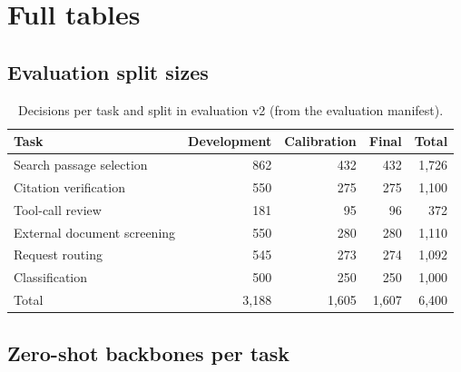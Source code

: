 \section{Full tables}
\label{app:tables}

\subsection{Evaluation split sizes}

\begin{table}[h]
\centering
\small
\caption{Decisions per task and split in evaluation v2 (from the evaluation manifest).}
\label{tab:splits}
\begin{tabular}{@{}lrrrr@{}}
\toprule
Task & Development & Calibration & Final & Total \\
\midrule
Search passage selection & 862 & 432 & 432 & 1,726 \\
Citation verification & 550 & 275 & 275 & 1,100 \\
Tool-call review & 181 & 95 & 96 & 372 \\
External document screening & 550 & 280 & 280 & 1,110 \\
Request routing & 545 & 273 & 274 & 1,092 \\
Classification & 500 & 250 & 250 & 1,000 \\
\midrule
Total & 3,188 & 1,605 & 1,607 & 6,400 \\
\bottomrule
\end{tabular}
\end{table}

\subsection{Zero-shot backbones per task}

